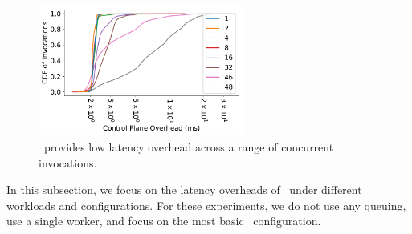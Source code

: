 \begin{figure}
  \includegraphics[width=0.6\textwidth]{iluvatar/graphs/scaling/pyaes/overhead-cdf.pdf}
     \caption{\sysname~provides low latency overhead across a range of concurrent invocations.}
    \label{fig:ovh-cdf-aes}
\end{figure}


In this subsection, we focus on the latency overheads of \sysname~under different workloads and configurations.
For these experiments, we do not use any queuing, use a single worker, and focus on the most basic \sysname~configuration.  


